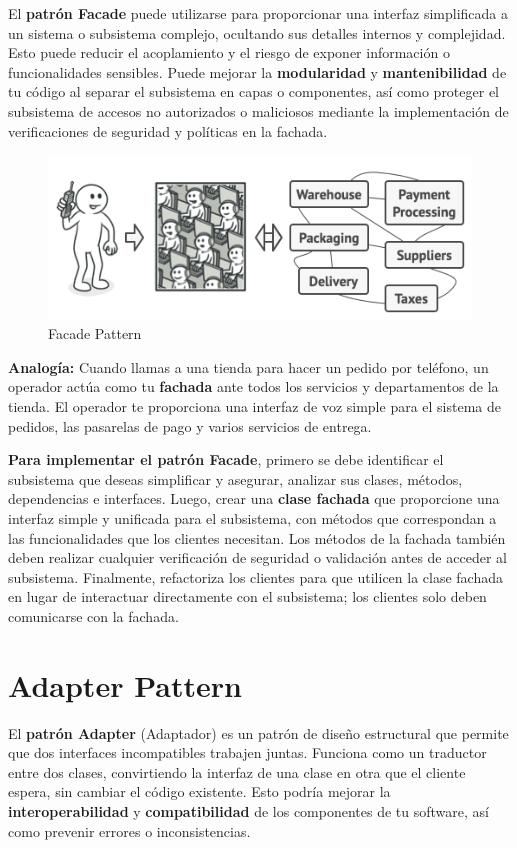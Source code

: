 El \textbf{patrón Facade} puede utilizarse para proporcionar una interfaz simplificada a un sistema o subsistema complejo, ocultando sus detalles internos y complejidad. Esto puede reducir el acoplamiento y el riesgo de exponer información o funcionalidades sensibles. Puede mejorar la \textbf{modularidad} y \textbf{mantenibilidad} de tu código al separar el subsistema en capas o componentes, así como proteger el subsistema de accesos no autorizados o maliciosos mediante la implementación de verificaciones de seguridad y políticas en la fachada. 

\begin{figure}[H]
    \centering
    \includegraphics[width=0.5\linewidth]{PatronesSoftware/facade.png}
    \caption{Facade Pattern}
    \label{fig:facade-pattern}
\end{figure}

\textbf{Analogía:} Cuando llamas a una tienda para hacer un pedido por teléfono, un operador actúa como tu \textbf{fachada} ante todos los servicios y departamentos de la tienda. El operador te proporciona una interfaz de voz simple para el sistema de pedidos, las pasarelas de pago y varios servicios de entrega. 

\textbf{Para implementar el patrón Facade}, primero se debe identificar el subsistema que deseas simplificar y asegurar, analizar sus clases, métodos, dependencias e interfaces. Luego, crear una\textbf{ clase fachada }que proporcione una interfaz simple y unificada para el subsistema, con métodos que correspondan a las funcionalidades que los clientes necesitan. Los métodos de la fachada también deben realizar cualquier verificación de seguridad o validación antes de acceder al subsistema. Finalmente, refactoriza los clientes para que utilicen la clase fachada en lugar de interactuar directamente con el subsistema; los clientes solo deben comunicarse con la fachada.

\section{Adapter Pattern}

El \textbf{patrón Adapter} (Adaptador) es un patrón de diseño estructural que permite que dos interfaces incompatibles trabajen juntas. Funciona como un traductor entre dos clases, convirtiendo la interfaz de una clase en otra que el cliente espera, sin cambiar el código existente. Esto podría mejorar la \textbf{interoperabilidad} y \textbf{compatibilidad} de los componentes de tu software, así como prevenir errores o inconsistencias. 

